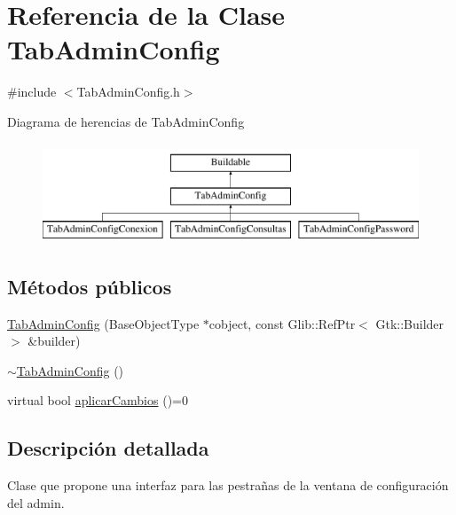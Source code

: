 \hypertarget{classTabAdminConfig}{\section{\-Referencia de la \-Clase \-Tab\-Admin\-Config}
\label{classTabAdminConfig}
}


{\ttfamily \#include $<$\-Tab\-Admin\-Config.\-h$>$}

\-Diagrama de herencias de \-Tab\-Admin\-Config\begin{figure}[H]
\begin{center}
\leavevmode
\includegraphics[height=3.000000cm]{classTabAdminConfig}
\end{center}
\end{figure}
\subsection*{\-Métodos públicos}
\begin{DoxyCompactItemize}
\item 
\hyperlink{classTabAdminConfig_ae39d038b082359ac62468b033ed1dc33}{\-Tab\-Admin\-Config} (\-Base\-Object\-Type $\ast$cobject, const \-Glib\-::\-Ref\-Ptr$<$ \-Gtk\-::\-Builder $>$ \&builder)
\item 
\hyperlink{classTabAdminConfig_ab0b578304e03802636e86230b060dcd0}{$\sim$\-Tab\-Admin\-Config} ()
\item 
virtual bool \hyperlink{classTabAdminConfig_a5f532e55e71d8099f61bcc2226edf15c}{aplicar\-Cambios} ()=0
\end{DoxyCompactItemize}


\subsection{\-Descripción detallada}
\-Clase que propone una interfaz para las pestrañas de la ventana de configuración del admin. 

